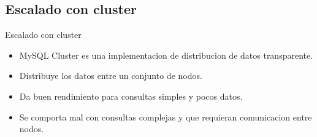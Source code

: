 \subsection{Escalado con cluster}
\begin{frame}{Escalado con cluster}
  \begin{itemize}
    \item MySQL Cluster es una implementacion de distribucion de datos transparente.
    \item Distribuye los datos entre un conjunto de nodos.
    \item Da buen rendimiento para consultas simples y pocos datos.
    \item Se comporta mal con consultas complejas y que requieran comunicacion entre nodos.
  \end{itemize}
\end{frame}
